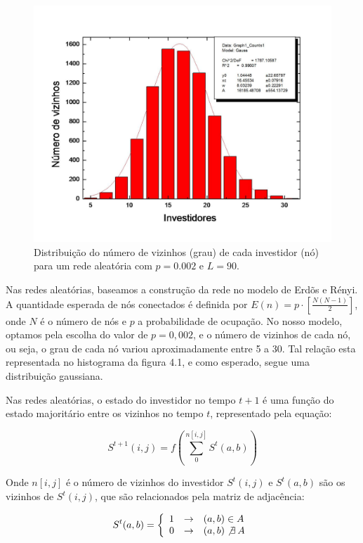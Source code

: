 \documentclass[brazil,ruledheader]{abnt}
\begin{document}
\begin{figure}[!h]
\centering
\includegraphics[width=0.8\linewidth]{Figuras/0.jpg}
 \caption{Distribuição do número de vizinhos (grau) de cada investidor
(nó) para um rede aleatória com $p=0.002$ e $L=90$.}
\end{figure}

Nas redes aleatórias, baseamos a construção da rede no modelo de Erdõs e Rényi.
A quantidade esperada de nós conectados é definida por  $E(n)=p \cdot \left[
\frac{N(N-1)}{2} \right]$, onde $N$ é o número de nós e $p$ a probabilidade de
ocupação.  No nosso modelo, optamos pela escolha do valor de $p=0,002$, e o
número de vizinhos de cada nó, ou seja, o grau de cada nó variou aproximadamente
entre 5 a 30. Tal relação esta representada no histograma da figura 4.1, e como
esperado, segue uma distribuição gaussiana.

Nas redes aleatórias, o estado do investidor no tempo $t+1$ é uma
função do estado majoritário entre os vizinhos no tempo $t$, representado pela
equação:



\begin{equation}
S^{t+1}(i,j)=f\left( \sum_{0}^{n[i,j]} S^t(a,b) \right)
\end{equation}

Onde $n[i,j]$ é o número de vizinhos do investidor $S^t(i,j)$ e $S^t(a,b)$ são
os vizinhos de $S^t(i,j)$, que são relacionados pela matriz de adjacência:

\begin{equation}
 S^t(a,b)=\left\{ \begin{array}{rcl}
1 & \rightarrow & (a,b) \in A \\
0 & \rightarrow & (a,b) \not\exists \mbox{\hspace{.2em}} A
\end{array}\right.
\end{equation}
\end{document}
